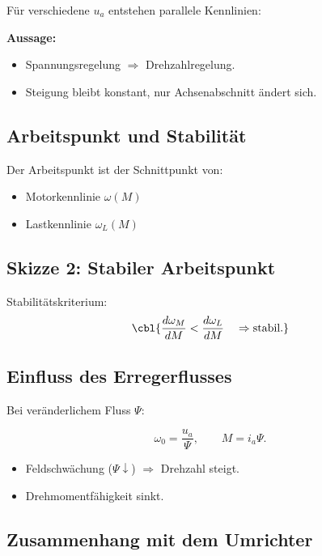 Für verschiedene $u_a$ entstehen parallele Kennlinien:

\textbf{Aussage:}
\begin{itemize}
    \item Spannungsregelung $\Rightarrow$ Drehzahlregelung.
    \item Steigung bleibt konstant, nur Achsenabschnitt ändert sich.
\end{itemize}

\subsection{Arbeitspunkt und Stabilität}

Der Arbeitspunkt ist der Schnittpunkt von:
\begin{itemize}
    \item Motorkennlinie $\omega(M)$
    \item Lastkennlinie $\omega_L(M)$
\end{itemize}

\subsection{Skizze 2: Stabiler Arbeitspunkt}



Stabilitätskriterium:
\[
\cbl{\frac{d\omega_M}{dM} < \frac{d\omega_L}{dM} \quad \Rightarrow \text{stabil}.}
\]


\subsection{Einfluss des Erregerflusses}

Bei veränderlichem Fluss $\Psi$:

\[
\omega_0 = \frac{u_a}{\Psi}, \qquad M = i_a \Psi.
\]

\begin{itemize}
    \item Feldschwächung ($\Psi \downarrow$) $\Rightarrow$ Drehzahl steigt.
    \item Drehmomentfähigkeit sinkt.
\end{itemize}

\subsection{Zusammenhang mit dem Umrichter}

